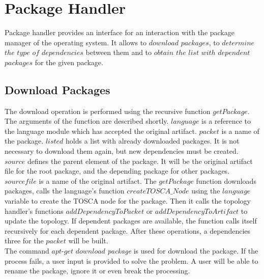 \section{Package Handler}
Package handler provides an interface for an interaction with the package manager of the operating system.
It allows to $download$ $packages$, to $determine$ $the$ $type$ $of$ $dependencies$ between them and to $obtain$ $the$ $list$ $with$ $dependent$ $packages$ for the given package.

\subsection*{Download Packages}
The download operation is performed using the recursive function $getPackage$. 
The arguments of the function are described shortly.
$language$ is a reference to the language module which has accepted the original artifact.
$packet$ is a name of the package.
$listed$ holds a list with already downloaded packages.
It is not necessary to download them again, but new dependencies must be created.
$source$ defines the parent element of the package. 
It will be the original artifact file for the root package, and the depending package for other packages.
$sourcefile$ is a name of the original artifact.
The $getPackage$ function downloads packages, calls the language's function $createTOSCA\_Node$ using the $language$ variable to create the TOSCA node for the package.
Then it calls the topology handler's functions $addDependencyToPacket$ or $addDependencyToArtifact$ to update the topology. 
If dependent packages are available, the function calls itself recursively for each dependent package.
After these operations, a dependencies three for the $packet$ will be built.\\
The command $apt$-$get$ $download$ \emph{package} is used for download the package. 
If the process fails, a user input is provided to solve the problem. 
A user will be able to rename the package, ignore it or even break the processing.

